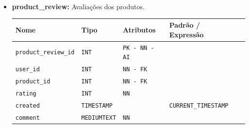 \begin{itemize}
    \item \textbf{product\_review:}
    Avaliações dos produtos. 
    \begin{table}[H]
        \centering
        \begin{tabularx}{\linewidth}{XXXXX}
        \toprule
        \textbf{\color{color_scheme}Nome} & \textbf{\color{color_scheme}Tipo} & \textbf{\color{color_scheme}Atributos} & \textbf{\color{color_scheme}Padrão / Expressão}\\
        \midrule
        \texttt{product\_review\_id} & \texttt{INT} & \texttt{PK - NN - AI} &\\
        \texttt{user\_id} & \texttt{INT} & \texttt{NN - FK} &\\
        \texttt{product\_id} & \texttt{INT} & \texttt{NN - FK} &\\
        \texttt{rating} & \texttt{INT}  & \texttt{NN}  & \\
        \texttt{created} & \texttt{TIMESTAMP}  &  & \texttt{CURRENT\_TIMESTAMP}\\
        \texttt{comment} & \texttt{MEDIUMTEXT}  & \texttt{NN} & \\
        \bottomrule
        \end{tabularx}
        \label{table: product_reviews}
    \end{table}


\end{itemize}
